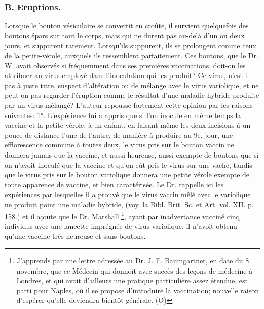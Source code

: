 \subsubsection{B. Eruptions.}
Lorsque le bouton vésiculaire se convertit en croûte, il survient quelquefois des boutons épars sur tout le corps, mais qui ne durent pas au-delà d'un ou deux jours, et suppurent rarement. Lorsqu'ils suppurent, ils se prolongent comme ceux de la petite-vérole, auxquels ils ressemblent parfaitement.
Ces boutons, que le Dr. W. avait observés si fréquemment dans ses premières vaccinations, doit-on les attribuer au virus employé dans l'inoculation qui les produit? Ce virus, n'est-il pas à juste titre, suspect d'altération ou de mélange avec le virus variolique, et ne peut-on pas regarder l'éruption comme le résultat d'une maladie hybride produite par un virus mélangé?
L'auteur repousse fortement cette opinion par les raisons suivantes:
1°. L'expérience lui a appris que si l'on inocule en même temps la vaccine et la petite-vérole, à un enfant, en faisant même les deux incisions à un pouce de distance l'une de l'autre,\setcounter{page}{366} de manière à produire au 9e. jour, une efflorescence commune à toutes deux, le virus pris sur le bouton vaccin ne donnera jamais que la vaccine, et aussi heureuse, aussi exempte de boutons que si on n'avoit inoculé que la vaccine et qu'on eût pris le virus sur une vache, tandis que le virus pris sur le bouton variolique donnera une petite vérole exempte de toute apparence de vaccine, et bien caractérisée. Le Dr. rappelle ici les expériences par lesquelles il a prouvé que le virus vaccin mêlé avec le variolique ne produit point une maladie hybride, (voy. la Bibl. Brit. Sc. et Art. vol. XII. p. 158.) et il ajoute que le Dr. Marshall \footnote{J'apprends par une lettre adressée au Dr. J. F. Baumgartner, en date du 8 novembre, que ce Médecin qui donnoit avec succès des leçons de médecine à Londres, et qui avoit d'ailleurs une pratique particulière assez étendue, est parti pour Naples, où il se propose d'introduire la vaccination; nouvelle raison d'espérer qu'elle deviendra bientôt générale. (O)}, ayant par inadvertance vacciné cinq individus avec une lancette imprégnée de virus variolique, il n'avoit obtenu qu'une vaccine très-heureuse et sans boutons.
